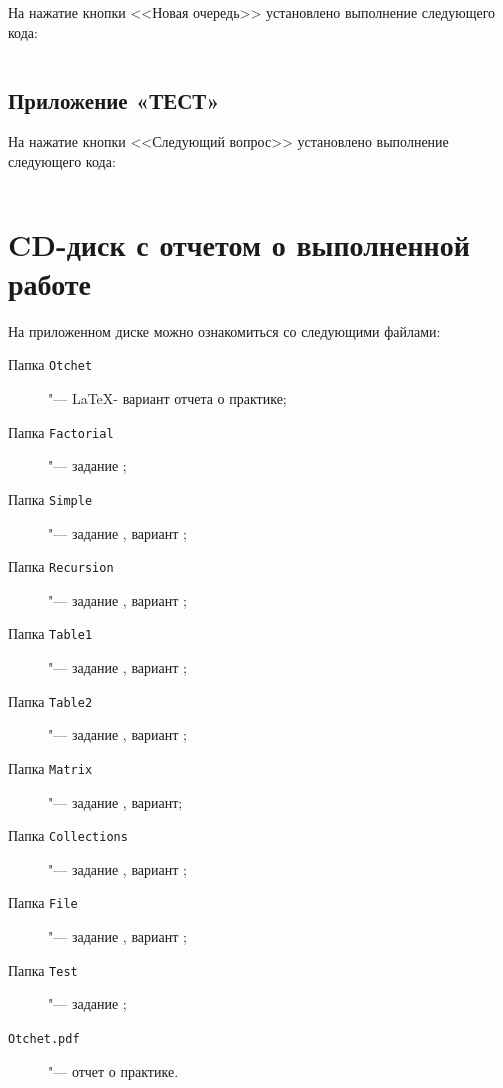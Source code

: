 \documentclass[bachelor, och, pract, times]{SCWorks}
\begin{document}
На нажатие кнопки <<Новая очередь>> установлено выполнение следующего кода:
\inputminted[fontsize=\footnotesize]{cpp}{Колекции/NewQu.cpp}



\subsection*{Приложение «ТЕСТ»}
На нажатие кнопки <<Следующий вопрос>> установлено выполнение следующего кода:
\inputminted[fontsize=\footnotesize]{cpp}{Тест/Next.cpp}



\section{CD-диск с отчетом о выполненной работе}\label{app:CD}
На приложенном диске можно ознакомиться со следующими файлами:
\begin{description}
\item[Папка \texttt{Otchet}] "---   \LaTeX- вариант отчета о практике;
\item[Папка \texttt{Factorial}] "--- задание ;
\item[Папка \texttt{Simple}] "---  задание , вариант ;
\item[Папка \texttt{Recursion}] "--- задание , вариант ;
\item[Папка \texttt{Table1}] "--- задание , вариант ;
\item[Папка \texttt{Table2}] "--- задание , вариант ;
\item[Папка \texttt{Matrix}] "--- задание , вариант;
\item[Папка \texttt{Collections}] "--- задание , вариант ;
\item[Папка \texttt{File}] "--- задание , вариант ;
\item[Папка \texttt{Test}] "--- задание ;

\item[\texttt{Otchet.pdf}] "--- отчет о практике.
\end{description}
    
    
    
    
\end{document}
